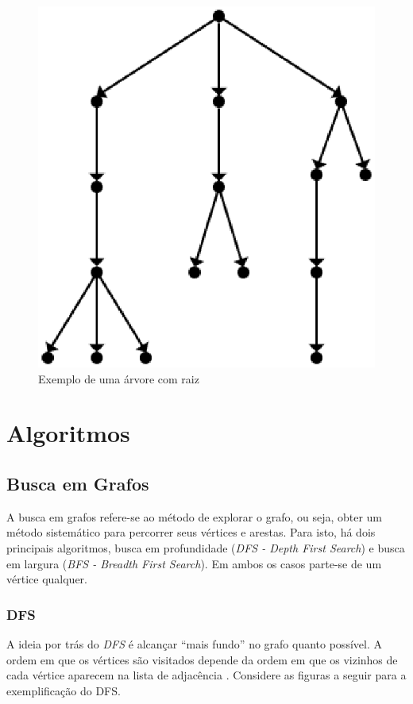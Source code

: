 \begin{figure}[!h]
	\centering
	\includegraphics[scale=0.2]{figuras/capitulo2/arvore_raiz.eps}
	\caption{Exemplo de uma árvore com raiz}
	\label{arvore_raiz}
\end{figure}

\section{Algoritmos}

\subsection{Busca em Grafos}

A busca em grafos refere-se ao método de explorar o grafo, ou seja, obter um método sistemático para percorrer seus vértices e arestas. Para isto, há dois principais algoritmos, busca em profundidade (\textit{DFS - Depth First Search}) e busca em largura (\textit{BFS - Breadth First Search}). Em ambos os casos parte-se de um vértice qualquer.

\subsubsection{DFS}
A ideia por trás do \textit{DFS} é alcançar ``mais fundo'' no grafo quanto possível. A ordem em que os vértices são visitados depende da ordem em que os vizinhos de cada vértice aparecem na lista de adjacência \cite{Cormen:2001}. Considere as figuras a seguir para a exemplificação do DFS.

